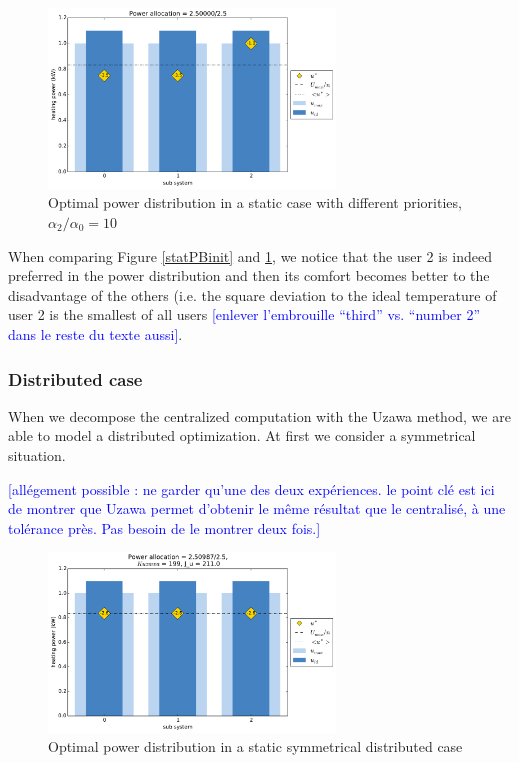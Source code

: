 \documentclass[conference]{IEEEtran}
\newcommand{\rem}[1]{\textcolor{blue}{[#1]}}
\begin{document}
\begin{figure}[H]
\centering
\includegraphics[width=3in]{static_PB_cht.pdf}
\caption{Optimal power distribution in a static case with different priorities, $\alpha_2 / \alpha_0 = 10$}
\label{statPBcom}
\end{figure}

When comparing Figure \ref{statPBinit} and \ref{statPBcom}, we notice that the user 2 is indeed preferred in the power distribution and then its comfort becomes better to the disadvantage of the others (i.e. the square deviation to the ideal temperature of user 2 is the smallest of all users \rem{enlever l'embrouille ``third'' vs. ``number 2'' dans le reste du texte aussi}.

\subsubsection{Distributed case}
When we decompose the centralized computation with the Uzawa method, we are able to model a distributed optimization. At first we consider a symmetrical situation.  

\rem{allégement possible : ne garder qu'une des deux expériences. le point clé est ici de montrer que Uzawa permet d'obtenir le même résultat que le centralisé, à une tolérance près. Pas besoin de le montrer deux fois.}

\begin{figure}[H]
\centering
\includegraphics[width=3in]{static_DPB_init.pdf}
\caption{Optimal power distribution in a static symmetrical distributed case}
\label{statDPBinit}
\end{figure}
\end{document}
